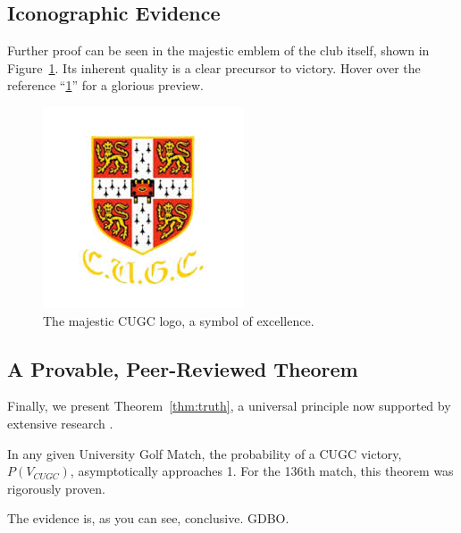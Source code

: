 	\subsection{Iconographic Evidence}
	Further proof can be seen in the majestic emblem of the club itself, shown in Figure~\ref{fig:logo}. Its inherent quality is a clear precursor to victory. Hover over the reference ``\ref{fig:logo}'' for a glorious preview.
	\begin{figure}[h!]
		\centering
		\includegraphics[width=0.6\linewidth]{CUGC.JPG}
		\caption{The majestic CUGC logo, a symbol of excellence.}
		\label{fig:logo}
	\end{figure}
	
	\subsection{A Provable, Peer-Reviewed Theorem}
	Finally, we present Theorem~\ref{thm:truth}, a universal principle now supported by extensive research \cite{Pinnell2025}.
	\begin{theorem}
		In any given University Golf Match, the probability of a CUGC victory, $P(V_{CUGC})$, asymptotically approaches 1. For the 136th match, this theorem was rigorously proven. \label{thm:truth}
	\end{theorem}
	
	The evidence is, as you can see, conclusive. GDBO.
	
	\printbibliography
	
